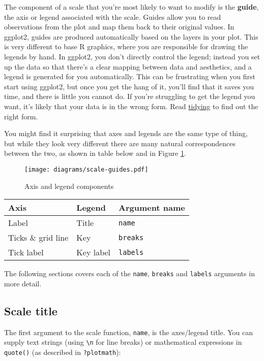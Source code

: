 The component of a scale that you're most likely to want to modify is
the \textbf{guide}, the axis or legend associated with the scale. Guides
allow you to read observations from the plot and map them back to their
original values. In ggplot2, guides are produced automatically based on
the layers in your plot. This is very different to base R graphics,
where you are responsible for drawing the legends by hand. In ggplot2,
you don't directly control the legend; instead you set up the data so
that there's a clear mapping between data and aesthetics, and a legend
is generated for you automatically. This can be frustrating when you
first start using ggplot2, but once you get the hang of it, you'll find
that it saves you time, and there is little you cannot do. If you're
struggling to get the legend you want, it's likely that your data is in
the wrong form. Read \protect\hyperlink{cha:data}{tidying} to find out
the right form.

You might find it surprising that axes and legends are the same type of
thing, but while they look very different there are many natural
correspondences between the two, as shown in table below and in Figure
\ref{fig:guides}.   

\begin{figure}[htbp]
  \centering
  \texttt{[image: diagrams/scale-guides.pdf]}
  \caption{Axis and legend components}
  \label{fig:guides}
\end{figure}

\begin{longtable}[]{@{}lll@{}}
\toprule
Axis & Legend & Argument name\tabularnewline
\midrule
\endhead
Label & Title & \texttt{name}\tabularnewline
Ticks \& grid line & Key & \texttt{breaks}\tabularnewline
Tick label & Key label & \texttt{labels}\tabularnewline
\bottomrule
\end{longtable}

The following sections covers each of the \texttt{name}, \texttt{breaks}
and \texttt{labels} arguments in more detail.

\hypertarget{scale-title}{%
\subsection{Scale title}\label{scale-title}}

The first argument to the scale function, \texttt{name}, is the
axes/legend title. You can supply text strings (using
\texttt{\textbackslash{}n} for line breaks) or mathematical expressions
in \texttt{quote()} (as described in \texttt{?plotmath}):
 

